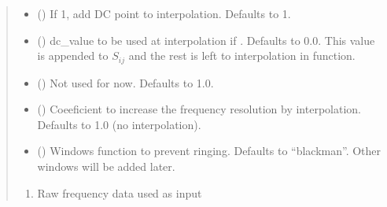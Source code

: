 \documentclass[letterpaper,10pt,english]{sphinxmanual}
\begin{document}
\begin{fulllineitems}
\begin{fulllineitems}
\begin{quote}
\begin{description}
\begin{itemize}
\item {} 
\sphinxAtStartPar
{} (\sphinxstyleliteralemphasis{\sphinxupquote{, }}) \textendash{} If 1, add DC point to interpolation. Defaults to 1.

\item {} 
\sphinxAtStartPar
{} (\sphinxstyleliteralemphasis{\sphinxupquote{, }}) \textendash{} dc\_value to be used at interpolation if . Defaults to 0.0. This value is appended to \(S_{i j}\) and the rest is left to interpolation in  function.

\item {} 
\sphinxAtStartPar
{} (\sphinxstyleliteralemphasis{\sphinxupquote{, }}) \textendash{} Not used for now. Defaults to 1.0.

\item {} 
\sphinxAtStartPar
{} (\sphinxstyleliteralemphasis{\sphinxupquote{, }}) \textendash{} Coeeficient to increase the frequency resolution by interpolation. Defaults to 1.0 (no interpolation).

\item {} 
\sphinxAtStartPar
{} (\sphinxstyleliteralemphasis{\sphinxupquote{, }}) \textendash{} Windows function to prevent ringing. Defaults to “blackman”. Other windows will be added later.

\end{itemize}

\sphinxAtStartPar
\begin{description}
\begin{enumerate}
%
\item {} 
\sphinxAtStartPar
Raw frequency data used as input


\end{enumerate}
\end{description}
\end{description}
\end{quote}
\end{fulllineitems}
\end{fulllineitems}
\end{document}
